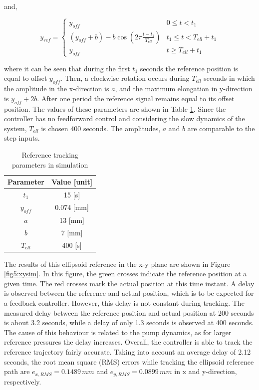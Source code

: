 and,


\begin{equation}
    y_{ref} = \begin{cases} 
       y_{off} &  0 \leq t < t_1 \\
     (y_{off} +b) -  b \cos(2\pi \frac{t - t_1}{T_{ell}}) & t_1 \leq t < T_{ell} + t_1 \\
     y_{off} & t \geq T_{ell} + t_1
   \end{cases}  
   \end{equation}

where it can be seen that during the first $t_1$ seconds the reference position is equal to offset $y_{off}$. Then, a clockwise rotation occurs during $T_{ell}$ seconds in which the amplitude in the x-direction is $a$, and the maximum elongation in y-direction is $y_{off} + 2b$. After one period the reference signal remains equal to its offset position. The values of these parameters are shown in Table \ref{tab5:refparamssim}. Since the controller has no feedforward control and considering the slow dynamics of the system, $T_{ell}$ is chosen 400 seconds. The amplitudes, $a$ and $b$ are comparable to the step inputs.


\begin{table}[H]
    \centering
    \caption{Reference tracking parameters in simulation}
    \begin{tabular}{|c|c|} \hline
   \textbf{Parameter}  & \textbf{Value [unit]} \\ \hline
    $t_1$ &   15 [s]  \\ 
    $y_{off}$ & 0.074 [mm] \\
    $a$ & 13 [mm] \\
    $b$ & 7 [mm] \\
    $T_{ell}$ & 400 [s] \\ \hline
\end{tabular}
    \label{tab5:refparamssim}
\end{table}


The results of this ellipsoid reference in the x-y plane are shown in Figure \ref{fig5:xysim}. In this figure, the green crosses indicate the reference position at a given time. The red crosses mark the actual position at this time instant. A delay is observed between the reference and actual position, which is to be expected for a feedback controller. However, this delay is not constant during tracking. The measured delay between the reference position and actual position at 200 seconds is about 3.2 seconds, while a delay of only 1.3 seconds is observed at 400 seconds. The cause of this behaviour is related to the pump dynamics, as for larger reference pressures the delay increases. Overall, the controller is able to track the reference trajectory fairly accurate. Taking into account an average delay of 2.12 seconds, the root mean square (RMS) errors while tracking the ellipsoid reference path are $e_{x,RMS} = 0.1489 \hspace{2pt} mm$ and $e_{y,RMS} =0.0899 \hspace{2pt} mm$ in x and y-direction, respectively.

